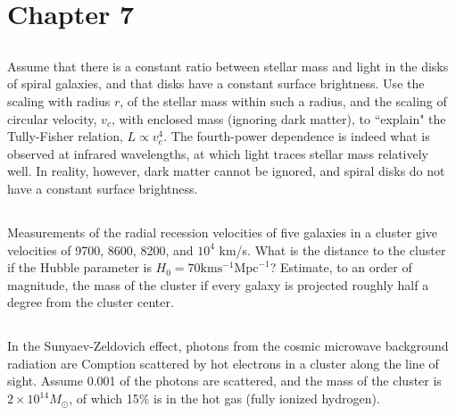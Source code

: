 \documentclass[12pt]{article}
\begin{document}
\newcommand{\mpc}{\mathrm{Mpc}}
\newcommand{\km}{\mathrm{km}}
\newcommand{\solarmass}{M_{\odot}}
\newcommand{\s}{\mathrm{s}}
\newcommand{\is}{\sec^{-1}}
\newcommand{\ikm}{\km^{-1}}
\newcommand{\impc}{\mpc^{-1}}

\newcommand{\reh}{r_\mathrm{eh}}
\newcommand{\rh}{t_\mathrm{h}}
\newcommand{\el}{\epsilon_\Lambda}

\setcounter{section}{7}

\section*{Chapter 7}

\subsection{} %

Assume that there is a constant ratio between stellar mass and light in the disks of spiral galaxies, and that disks have a constant surface brightness. Use the scaling with radius \(r\), of the stellar mass within such a radius, and the scaling of circular velocity, \(v_c\), with enclosed mass (ignoring dark matter), to ``explain" the Tully-Fisher relation, \(L \propto v_c^4\). The fourth-power dependence is indeed what is observed at infrared wavelengths, at which light traces stellar mass relatively well. In reality, however, dark matter cannot be ignored, and spiral disks do not have a constant surface brightness.

\subsection{} %

Measurements of the radial recession velocities of five galaxies in a cluster give velocities of 9700, 8600, 8200, and \(10^4\) km/s. What is the distance to the cluster if the Hubble parameter is \(H_0 = 70 \mathrm{km}\mathrm{s}^{-1}\mathrm{Mpc}^{-1}\)? Estimate, to an order of magnitude, the mass of the cluster if every galaxy is projected roughly half a degree from the cluster center.

\subsection{} %

In the Sunyaev-Zeldovich effect, photons from the cosmic microwave background radiation are Comption scattered by hot electrons in a cluster along the line of sight. Assume 0.001 of the photons are scattered, and the mass of the cluster is \(2 \times 10^{14} \solarmass\), of which 15\% is in the hot gas (fully ionized hydrogen).
\end{document}
